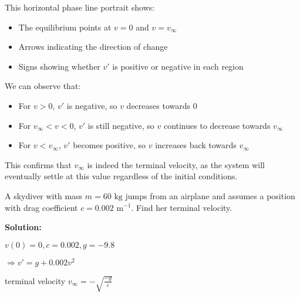 \documentclass{article}
\begin{document}
\begin{center}
\end{center}

This horizontal phase line portrait shows:
\begin{itemize}
    \item The equilibrium points at $v=0$ and $v=v_\infty$
    \item Arrows indicating the direction of change
    \item Signs showing whether $v'$ is positive or negative in each region
\end{itemize}

We can observe that:
\begin{itemize}
    \item For $v > 0$, $v'$ is negative, so $v$ decreases towards 0
    \item For $v_\infty < v < 0$, $v'$ is still negative, so $v$ continues to decrease towards $v_\infty$
    \item For $v < v_\infty$, $v'$ becomes positive, so $v$ increases back towards $v_\infty$
\end{itemize}

This confirms that $v_\infty$ is indeed the terminal velocity, as the system will eventually settle at this value regardless of the initial conditions.


A skydiver with mass $m = 60\text{ kg}$ jumps from an airplane and assumes a position with drag coefficient $c = 0.002\text{ m}^{-1}$. Find her terminal velocity.

\textbf{Solution:}

$v(0) = 0, c = 0.002, g = -9.8$

$\Rightarrow v' = g+0.002v^2$

terminal velocity $v_\infty = -\sqrt{\frac{-g}{c}}$
\end{document}
